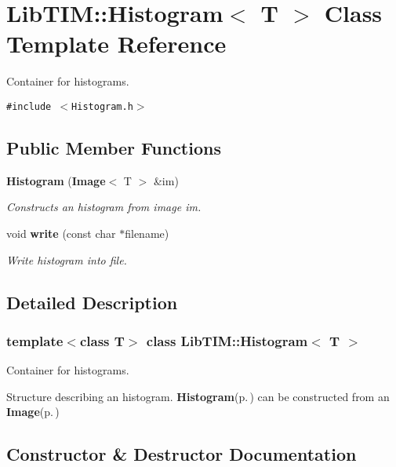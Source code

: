 \section{Lib\-TIM::Histogram$<$ T $>$ Class Template Reference}
\label{classLibTIM_1_1Histogram}
Container for histograms.  


{\tt \#include $<$Histogram.h$>$}

\subsection*{Public Member Functions}
\begin{CompactItemize}
\item 
{\bf Histogram} ({\bf Image}$<$ T $>$ \&im)
\begin{CompactList}\small\item\em Constructs an histogram from image im. \item\end{CompactList}\item 
void {\bf write} (const char $\ast$filename)
\begin{CompactList}\small\item\em Write histogram into file. \item\end{CompactList}\end{CompactItemize}


\subsection{Detailed Description}
\subsubsection*{template$<$class T$>$ class Lib\-TIM::Histogram$<$ T $>$}

Container for histograms. 

Structure describing an histogram. {\bf Histogram}{\rm (p.\,\pageref{classLibTIM_1_1Histogram})} can be constructed from an {\bf Image}{\rm (p.\,\pageref{classLibTIM_1_1Image})}



\subsection{Constructor \& Destructor Documentation}
